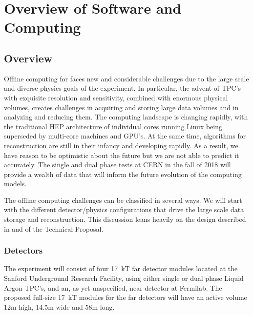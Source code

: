 %
\chapter{Overview of Software and Computing }


\section{Overview}

Offline computing for   faces new and considerable challenges due to the large scale and diverse physics goals of the experiment.  In particular, the advent of  TPC's with exquisite resolution and sensitivity, combined with enormous physical volumes, creates challenges in acquiring and storing large data volumes and in analyzing and reducing them.  The computing landscape is changing rapidly, with the traditional HEP architecture of individual cores running Linux being superseded by multi-core machines and GPU's. At the same time, algorithms for  reconstruction are still in their infancy and developing rapidly.  As a result, we have reason to be optimistic about the future but we are not able to predict it accurately.  The  single and dual phase tests at CERN in the fall of 2018 will provide a wealth of data that will inform the future evolution of  the  computing models.

The   offline computing challenges can be classified in several ways.  We will start with the different detector/physics configurations that drive the large scale data storage and reconstruction. 
This discussion leans heavily on the  design described in \voltitlespfd and \voltitledpfd  of the  Technical Proposal. 

\subsection{Detectors}

The  experiment will consist of four 17~kT far detector modules located at  the Sanford Underground Research Facility, using either single or dual phase Liquid Argon TPC's, and an, as yet unspecified, near detector at Fermilab.
The proposed  full-size 17~kT modules for the far detectors will  have an active volume 12m high, 14.5m wide and 58m long. 

